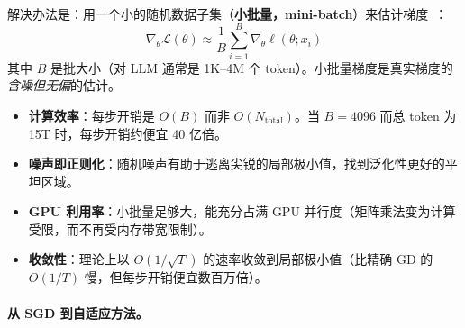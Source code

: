 解决办法是：用一个小的随机数据子集（\textbf{小批量，mini-batch}）来估计梯度~\cite{robbins1951stochastic}：
\[
\nabla_\theta \mathcal{L}(\theta) \approx \frac{1}{B}\sum_{i=1}^{B} \nabla_\theta \ell(\theta; x_i)
\]
其中 $B$ 是批大小（对 LLM 通常是 1K--4M 个 token）。小批量梯度是真实梯度的\emph{含噪但无偏}的估计。

\begin{keybox}
\begin{itemize}
  \item \textbf{计算效率}：每步开销是 $O(B)$ 而非 $O(N_{\text{total}})$。当 $B = 4096$ 而总 token 为 15T 时，每步开销约便宜 40 亿倍。
  \item \textbf{噪声即正则化}：随机噪声有助于逃离尖锐的局部极小值，找到泛化性更好的平坦区域。
  \item \textbf{GPU 利用率}：小批量足够大，能充分占满 GPU 并行度（矩阵乘法变为计算受限，而不再受内存带宽限制）。
  \item \textbf{收敛性}：理论上以 $O(1/\sqrt{T})$ 的速率收敛到局部极小值（比精确 GD 的 $O(1/T)$ 慢，但每步开销便宜数百万倍）。
\end{itemize}
\end{keybox}

\paragraph{从 SGD 到自适应方法。}
\label{from-sgd-to-adaptive-methods.}

